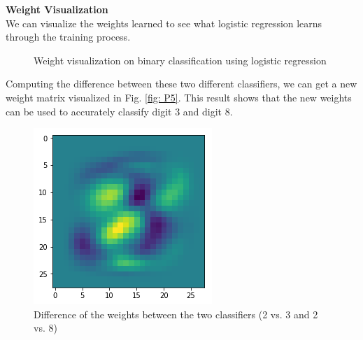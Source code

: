\documentclass{article} %
\begin{document}
\textbf{Weight Visualization}\\
We can visualize the weights learned to see what logistic regression learns through the training process. 

\begin{figure}%
	\centering
	\qquad
	\caption{Weight visualization on binary classification using logistic regression}%
	\label{fig:P4}%
\end{figure}

Computing the difference between these two different classifiers, we can get a new weight matrix visualized in Fig. \ref{fig: P5}. This result shows that the new weights can be used to accurately classify digit 3 and digit 8.

\begin{figure}[t]
 \centering
 \includegraphics[width=0.4\linewidth]{images/P5.png}
 \caption{Difference of the weights between the two classifiers (2 vs. 3 and 2 vs. 8)}
 \label{fig:P5}
\end{figure}
\end{document}
